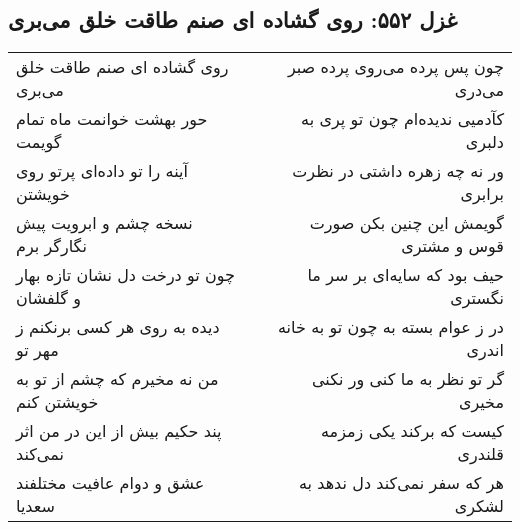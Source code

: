 \begin{center}
\section*{غزل ۵۵۲: روی گشاده ای صنم طاقت خلق می‌بری}
\label{sec:552}
\begin{longtable}{l p{0.5cm} r}
روی گشاده ای صنم طاقت خلق می‌بری
&&
چون پس پرده می‌روی پرده صبر می‌دری
\\
حور بهشت خوانمت ماه تمام گویمت
&&
کآدمیی ندیده‌ام چون تو پری به دلبری
\\
آینه را تو داده‌ای پرتو روی خویشتن
&&
ور نه چه زهره داشتی در نظرت برابری
\\
نسخه چشم و ابرویت پیش نگارگر برم
&&
گویمش این چنین بکن صورت قوس و مشتری
\\
چون تو درخت دل نشان تازه بهار و گلفشان
&&
حیف بود که سایه‌ای بر سر ما نگستری
\\
دیده به روی هر کسی برنکنم ز مهر تو
&&
در ز عوام بسته به چون تو به خانه اندری
\\
من نه مخیرم که چشم از تو به خویشتن کنم
&&
گر تو نظر به ما کنی ور نکنی مخیری
\\
پند حکیم بیش از این در من اثر نمی‌کند
&&
کیست که برکند یکی زمزمه قلندری
\\
عشق و دوام عافیت مختلفند سعدیا
&&
هر که سفر نمی‌کند دل ندهد به لشکری
\\
\end{longtable}
\end{center}
